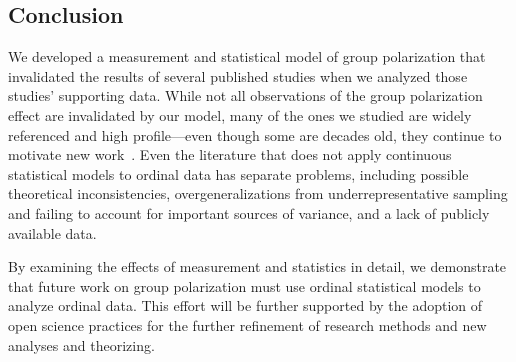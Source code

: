 


\subsection{Conclusion}

We developed a measurement and statistical model of group polarization that
invalidated the results of several published studies when we analyzed those
studies' supporting data.
While not all observations of the group polarization effect
are invalidated by our model, many of the ones we studied are
widely referenced and high profile---even though some are decades old, they
continue to motivate new work~\cite{Mas2013,Keating2016,Sieber2019,Pallavicini2021}.
Even the literature that does not apply continuous statistical models to
ordinal data has separate problems, including possible theoretical 
inconsistencies, overgeneralizations from underrepresentative sampling and
failing to account for important sources of variance, and a lack of publicly
available data.

By examining the effects of measurement and statistics in detail, we 
demonstrate that future work on group polarization must use ordinal 
statistical models to analyze ordinal data. This effort will be further supported 
by the adoption of open science practices for the further refinement of
research methods and new analyses and theorizing.



